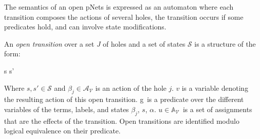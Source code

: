 \documentclass{llncs}
\newcommand{\Simon}{\\\hfill\mdash Simon}
\newcommand{\noteSB}[2][color=green!40, size=\tiny]{\todo[#1]{{#2}\Simon}}
\newcommand{\cA}{\ensuremath{\mathcal{A}}}
\newcommand{\sA}{\ensuremath{\mathbb{A}}}
\newcommand{\cV}{\ensuremath{\mathcal{V}}}
\newcommand{\mdash}[1][]{---#1}
\newcommand{\goesto}[2][]{\ensuremath{\xrightarrow[{#1}\relax]{#2}}}
\newcommand{\variables}{\ensuremath{\cV}}
\newcommand{\actions}[1]{\ensuremath{\cA_{#1}}}
\newcommand{\assigns}[1]{\ensuremath{\sA_{#1}}}
\begin{document}
\renewcommand{\Pred}{g}
\renewcommand{\Post}{u}
The semantics of an open pNets is expressed as  an automaton where each transition composes the actions of several holes, 
the transition occurs if some predicates hold, and can involve  
 state modifications.
\begin{definition}
	\label{defn:OpenTransitions}
	An \emph{open transition} over a
	set $J$ of holes  and a set of states $\mathcal{S}$ is 
	a structure of the form:
\\[-2ex]	
	\begin{mathpar}
	\inferrule*[myfraction=\reddottedrule]
	{	\beta_j^{j\in J}, \Pred, \Post}
	{s \OTarrow {{\alpha}}s'}
	\end{mathpar}
	Where $s, s'\in\mathcal{S}$ and $\beta_j\in\actions{\variables}$
        is an action of the hole $j$. $v$ is a variable denoting the resulting action
        of this open transition. \Pred\ is a predicate 
	over the different variables of the
	terms, labels, and states  $\beta_j$, $s$, $\alpha$. $\Post\in 
	\assigns{\variables}$\ is 
	a set of assignments that are the effects of the transition.
Open transitions are identified modulo logical equivalence on their predicate.
\end{definition}
\end{document}
